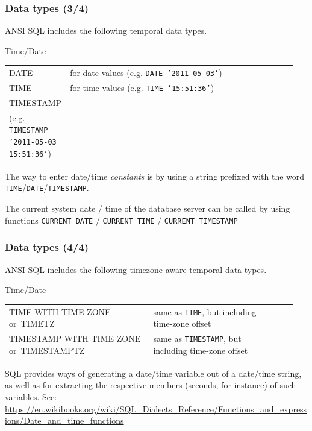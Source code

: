 \documentclass[english,serif,mathserif]{beamer}
\begin{document}
\begin{frame}[fragile]
  \frametitle{Data types (3/4)}
  \small

  ANSI SQL includes the following temporal data types.

  \begin{describe}{Time/Date}
    \begin{tabular}{>{\ttfamily\flushright}p{0.20\linewidth}>{\flushleft}p{0.75\linewidth}l}
      DATE& for date values (e.g. \texttt{DATE '2011-05-03'}) &\\
      TIME& for time values (e.g. \texttt{TIME '15:51:36'}) &\\
      TIMESTAMP& {\texttt{DATE} and \texttt{TIME} combined \\ (e.g. \texttt{TIMESTAMP '2011-05-03 15:51:36'})} &
    \end{tabular}
  \end{describe}

  \+
  The way to enter date/time \emph{constants} is by using a string prefixed with
  the word \texttt{TIME}/\texttt{DATE}/\texttt{TIMESTAMP}.

  \+ The current system date / time of the database server can be called by
  using functions \texttt{CURRENT\_DATE} / \texttt{CURRENT\_TIME} /
  \texttt{CURRENT\_TIMESTAMP}

\end{frame}


\begin{frame}[fragile]
  \frametitle{Data types (4/4)}
  \smaller

  ANSI SQL includes the following timezone-aware temporal data types.

  \begin{describe}{Time/Date}
    \begin{tabular}{>{\ttfamily\flushright}p{0.5\linewidth}>{\flushleft}p{0.45\linewidth}l}
      TIME WITH TIME ZONE \textnormal{or}~TIMETZ& same as \texttt{TIME}, but including time-zone offset &\\
      TIMESTAMP WITH TIME ZONE \textnormal{or}~TIMESTAMPTZ& same as \texttt{TIMESTAMP}, but including time-zone offset &\\
    \end{tabular}
  \end{describe}

  \+
  SQL provides ways of generating a date/time variable out of a date/time
  string, as well as for extracting the respective members (seconds, for
  instance) of such variables. See:
  \url{https://en.wikibooks.org/wiki/SQL_Dialects_Reference/Functions_and_expressions/Date_and_time_functions}
\end{frame}
\end{document}

